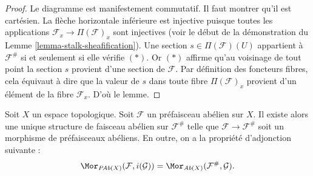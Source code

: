 \begin{proof}
Le diagramme est manifestement commutatif. Il faut montrer
qu'il est cartésien. La flèche horizontale inférieure
est injective puisque toutes les applications $\mathcal{F}_x \to \Pi(\mathcal{F})_x$
sont injectives (voir le début de la démonstration du
Lemme \ref{lemma-stalk-sheafification}).
Une section $s \in \Pi(\mathcal{F})(U)$ appartient à $\mathcal{F}^\#$ si et
seulement si elle vérifie $(*)$. Or $(*)$ affirme qu'au voisinage de tout point
la section $s$ provient d'une section de $\mathcal{F}$. Par définition
des foncteurs fibres, cela équivaut à dire que
la valeur de $s$ dans toute fibre $\Pi(\mathcal{F})_x$ provient
d'un élément de la fibre $\mathcal{F}_x$. D'où le lemme.
\end{proof}


\begin{lemma}
\label{lemma-sheafify-abelian-presheaf}
Soit $X$ un espace topologique.
Soit $\mathcal{F}$ un préfaisceau abélien sur $X$.
Il existe alors une unique structure de
faisceau abélien sur $\mathcal{F}^\#$ telle que
$\mathcal{F} \to \mathcal{F}^\#$ soit un morphisme
de préfaisceaux abéliens. En outre, on a la propriété
d'adjonction suivante :
$$
\Mor_{\textit{PAb}(X)}(\mathcal{F}, i(\mathcal{G}))
=
\Mor_{\textit{Ab}(X)}(\mathcal{F}^\#, \mathcal{G}).
$$
\end{lemma}

